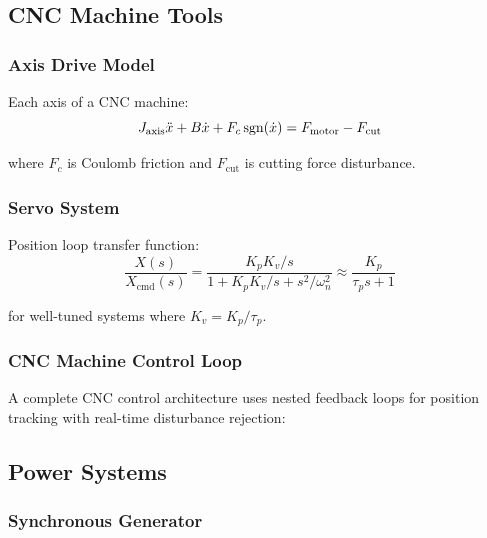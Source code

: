 \subsection{CNC Machine Tools}
\label{subsec:cnc}

\subsubsection{Axis Drive Model}

Each axis of a CNC machine:
\begin{equation}
J_{\text{axis}}\ddot{x} + B\dot{x} + F_c\operatorname{sgn}(\dot{x}) = F_{\text{motor}} - F_{\text{cut}}
\end{equation}

where $F_c$ is Coulomb friction and $F_{\text{cut}}$ is cutting force disturbance.

\subsubsection{Servo System}

Position loop transfer function:
\begin{equation}
\frac{X(s)}{X_{\text{cmd}}(s)} = \frac{K_p K_v/s}{1 + K_p K_v/s + s^2/\omega_n^2} \approx \frac{K_p}{\tau_p s + 1}
\end{equation}

for well-tuned systems where $K_v = K_p/\tau_p$.

\subsubsection{CNC Machine Control Loop}

A complete CNC control architecture uses nested feedback loops for position tracking with real-time disturbance rejection:



\subsection{Power Systems}
\label{subsec:power_systems}

\subsubsection{Synchronous Generator}

